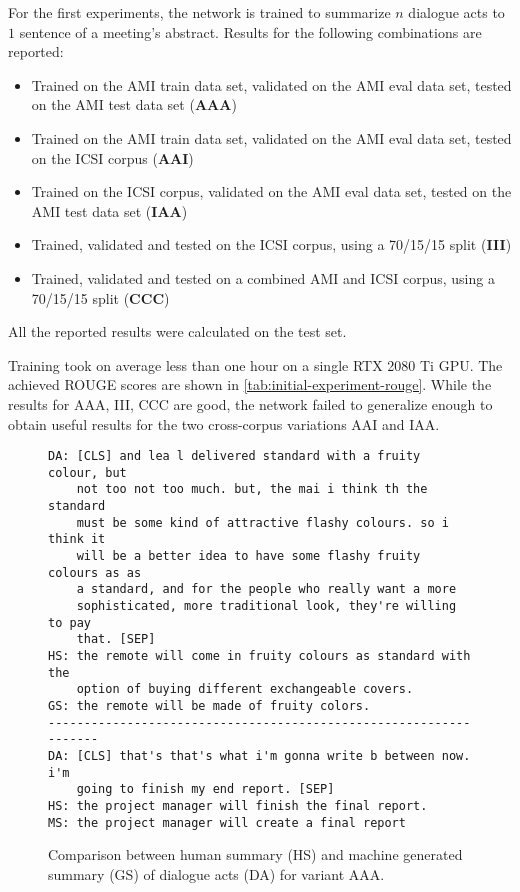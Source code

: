 For the first experiments, the network is trained to summarize $n$ dialogue acts to $1$ sentence of a meeting's abstract.
Results for the following combinations are reported:

\begin{itemize}
\item Trained on the AMI train data set, validated on the AMI eval data set, tested on the AMI test data set (\textbf{AAA})
\item Trained on the AMI train data set, validated on the AMI eval data set, tested on the ICSI corpus (\textbf{AAI})
\item Trained on the ICSI corpus, validated on the AMI eval data set, tested on the AMI test data set (\textbf{IAA})
\item Trained, validated and tested on the ICSI corpus, using a 70/15/15 split (\textbf{III})
\item Trained, validated and tested on a combined AMI and ICSI corpus, using a 70/15/15 split (\textbf{CCC})
\end{itemize}

All the reported results were calculated on the test set.

Training took on average less than one hour on a single RTX 2080 Ti GPU.
The achieved ROUGE scores are shown in \cref{tab:initial-experiment-rouge}.
While the results for AAA, III, CCC are good, the network failed to generalize enough to obtain useful results for the two cross-corpus variations AAI and IAA.

\begin{figure}[h]
\begin{lstlisting}[numbers=none]
DA: [CLS] and lea l delivered standard with a fruity colour, but
    not too not too much. but, the mai i think th the standard
    must be some kind of attractive flashy colours. so i think it
    will be a better idea to have some flashy fruity colours as as
    a standard, and for the people who really want a more
    sophisticated, more traditional look, they're willing to pay
    that. [SEP]
HS: the remote will come in fruity colours as standard with the
    option of buying different exchangeable covers.
GS: the remote will be made of fruity colors.
------------------------------------------------------------------
DA: [CLS] that's that's what i'm gonna write b between now. i'm
    going to finish my end report. [SEP]
HS: the project manager will finish the final report.
MS: the project manager will create a final report
\end{lstlisting}
\caption{Comparison between human summary (HS) and machine generated summary (GS) of dialogue acts (DA) for variant AAA.}
\label{fig:initial-experiment-example}
\end{figure}

